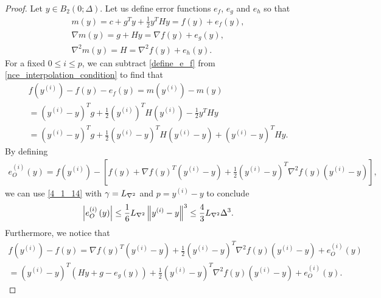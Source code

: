 \begin{proof}
Let $y \in B_2(0; \Delta)$.
Let us define error functions $e_f$, $e_g$ and $e_h$ so that
\begin{align}
m(y) = c + g^T y + \frac 1 2 y^T H y = f(y) + e_f(y) \label{define_e_f}, \\
\nabla m(y) = g + H y = \nabla f(y) + e_g(y), \nonumber \\
\nabla^2 m(y) = H = \nabla^2 f(y) + e_h(y). \nonumber
\end{align}
For a fixed $0 \le i \le p$, we can subtract \cref{define_e_f} from \cref{nce_interpolation_condition} to find that
\begin{align}
f\left(y^{(i)}\right) - f(y) - e_f(y)
= m\left(y^{(i)}\right) - m(y) \nonumber \\
= \left(y^{(i)} - y\right)^Tg + \frac 1 2 \left(y^{(i)}\right)^T H \left(y^{(i)}\right) - \frac 1 2 y^T H y \nonumber \\
= \left(y^{(i)} - y\right)^T g  + \frac 1 2 \left(y^{(i)} - y\right)^T H \left(y^{(i)} - y\right) + \left(y^{(i)} - y\right)^TH y. \label{nec_eqn2}
\end{align}
By defining
\begin{align*}
e^{(i)}_O(y) = 
f\left(y^{(i)}\right) - \left[f(y) + \nabla f(y)^T \left(y^{(i)} - y\right) + \frac 1 2 \left(y^{(i)} - y\right)^T \nabla^2 f(y) \left(y^{(i)} - y\right)\right],
\end{align*}
we can use \cref{4_1_14} with $\gamma = {L_{\nabla^2}}$ and $p = y^{(i)} - y$ to conclude
\begin{align}
\left|e^{(i)}_O\left(y\right) \right| \le \frac 1 6 {L_{\nabla^2}} \left\|y^{(i)} - y\right\|^3 \le \frac 4 3 {L_{\nabla^2}} \Delta^3 \label{nce_bound_rhs}.
\end{align}
Furthermore, we notice that
\begin{align*}
f\left(y^{(i)}\right) - f(y)
= \nabla f(y)^T \left(y^{(i)} - y\right) + \frac 1 2 \left(y^{(i)} - y\right)^T \nabla^2 f(y) \left(y^{(i)} - y\right) + e^{(i)}_O\left(y\right) \\
= \left(y^{(i)} - y\right)^T \left(Hy + g - e_g(y)\right) + \frac 1 2 \left(y^{(i)} - y\right)^T \nabla^2 f(y) \left(y^{(i)} - y\right) + e^{(i)}_O\left(y\right).

\end{align*}
\end{proof}
